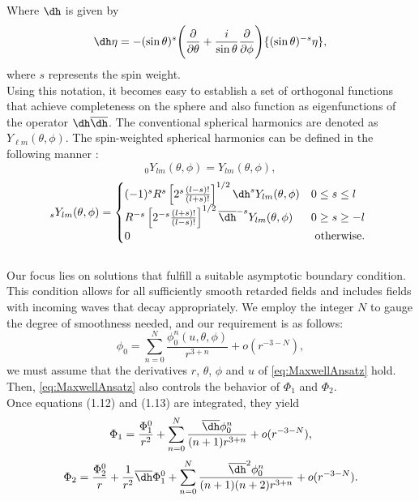 Where $\dh$ is given by $$\dh \eta = -(\sin \theta)^{s}\Biggl(\frac{\partial}{\partial \theta} + \frac{i}{\sin \theta}\frac{\partial}{\partial \phi}\Biggr)\{(\sin \theta)^{-s}\eta\},$$ where $s$ represents the spin weight.
\\
Using this notation, it becomes easy to establish a set of orthogonal functions that achieve completeness on the sphere and also function as eigenfunctions of the operator $\dh \overline{\dh}$. The conventional spherical harmonics are denoted as $Y_{\ell m}(\theta, \phi)$. The spin-weighted spherical harmonics can be defined in the following manner \cite{Ste91}:
\begin{equation}\label{eq:sphericalharmonics}
  { }_0 Y_{l m}(\theta, \phi)=Y_{l m}(\theta, \phi),
\end{equation}
\begin{equation}\label{eq:spinweightSH}
  { }_s Y_{l m}(\theta, \phi)= \begin{cases}(-1)^s R^s\left[2^s \frac{(l-s) !}{(l+s) !}\right]^{1 / 2} \dh^s Y_{l m}(\theta, \phi) & 0 \leq s \leq l \\ R^{-s}\left[2^{-s} \frac{(l+s) !}{(l-s) !}\right]^{1 / 2} \overline{\dh}^{-s} Y_{l m}(\theta, \phi) & 0 \geq s \geq-l \\ 0 & \text { otherwise. }\end{cases}
\end{equation}
\\
Our focus lies on solutions that fulfill a suitable asymptotic boundary condition. This condition allows for all sufficiently smooth retarded fields and includes fields with incoming waves that decay appropriately. We employ the integer $N$ to gauge the degree of smoothness needed, and our requirement is as follows:
\begin{equation}\label{eq:MaxwellAnsatz}
  \phi_{0}=\sum_{n=0}^{N}\frac{\phi_{0}^{n}(u,\theta,\phi)}{r^{3+n}}+o(r^{-3-N}),
\end{equation}
we must assume that the derivatives $r$, $\theta$, $\phi$ and $u$ of \eqref{eq:MaxwellAnsatz} hold. Then, \eqref{eq:MaxwellAnsatz} also controls the behavior of $\Phi_{1}$ and $\Phi_{2}$.\\
Once equations (1.12) and (1.13) are integrated, they yield
\begin{equation}\label{eq:Phi1}
  \Phi_{1} = \frac{\Phi_{1}^{0}}{r^2} + \sum_{n=0}^{N}\frac{\overline{\dh} \phi_{0}^{n}}{(n+1)r^{3+n}}+o(r^{-3-N}),
\end{equation}
\begin{equation}\label{eq:Phi2}
  \Phi_{2} = \frac{\Phi_{2}^{0}}{r} + \frac{1}{r^2}\overline{\dh} \Phi_{1}^{0} + \sum_{n=0}^{N}\frac{\overline{\dh}^2 \phi_{0}^{n}}{(n+1)(n+2)r^{3+n}}+o(r^{-3-N}).
\end{equation}
